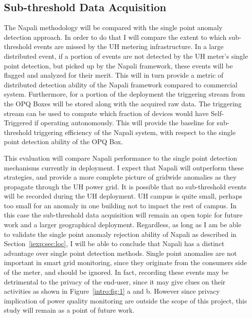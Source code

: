 
\subsection{Sub-threshold Data Acquisition}\label{subsec:sub-threshold-data-acquisition}
The Napali methodology will be compared with the single point anomaly detection approach.
In order to do that I will compare the extent to which sub-threshold events are missed by the UH metering infrastructure.
In a large distributed event, if a portion of events are not detected by the UH meter's single point detection, but picked up by the Napali framework, these events will be flagged and analyzed for their merit.
This will in turn provide a metric of distributed detection ability of the Napali framework compared to commercial system.
Furthermore, for a portion of the deployment the triggering stream from the OPQ Boxes will be stored along with the acquired raw data.
The triggering stream can be used to compute which fraction of devices would have Self-Triggered if operating autonomously.
This will provide the baseline for sub-threshold triggering efficiency of the Napali system, with respect to the single point detection ability of the OPQ Box.

This evaluation will compare Napali performance to the single point detection mechanisms currently in deployment.
I expect that Napali will outperform these strategies, and provide a more complete picture of gridwide anomalies as they propagate through the UH power grid.
It is possible that no sub-threshold events will be recorded during the UH deployment.
UH campus is quite small, perhaps too small for an anomaly in one building not to impact the rest of campus.
In this case the sub-threshold data acquisition will remain an open topic for future work and a larger geographical deployment.
Regardless, as long as I am be able to validate the single point anomaly rejection ability of Napali as described in Section~\ref{iexp:sec:loc}, I will be able to conclude that Napali has a distinct advantage over single point detection methods.
Single point anomalies are not important in smart grid monitoring, since they originate from the consumers side of the meter, and should be ignored.
In fact, recording these events may be detrimental to the privacy of the end-user, since it may give clues on their activities as shown in Figure~\ref{intro:fig:1} a and b.
However since privacy implication of power quality monitoring are outside the scope of this project, this study will remain as a point of future work.
